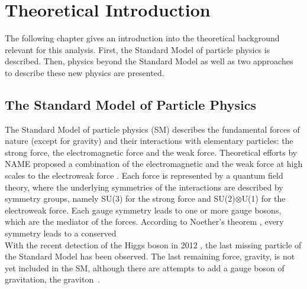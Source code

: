 \chapter{Theoretical Introduction}
\label{chap::TheoreticalIntroduction}
The following chapter gives an introduction into the theoretical background relevant for this analysis. First, the Standard Model of particle physics is described. Then, physics beyond the Standard Model as well as two approaches to describe these new physics are presented.

\section{The Standard Model of Particle Physics}
The Standard Model of particle physics (SM) describes the fundamental forces of nature (except for gravity) and their interactions with elementary particles: the strong force, the electromagnetic force and the weak force. Theoretical efforts by NAME proposed a combination of the electromagnetic and the weak force at high scales to the electroweak force \cite{EWK}. Each force is represented by a quantum field theory, where the underlying symmetries of the interactions are described by symmetry groups, namely SU(3) for the strong force and SU(2)$\otimes$U(1) for the electroweak force. Each gauge symmetry leads to one or more gauge bosons, which are the mediator of the forces. According to Noether's theorem \cite{noether}, every symmetry leads to a conserved \\
With the recent detection of the Higgs boson in 2012 \cite{cms_higgsdiscov}\cite{atlas_higgsdiscov}, the last missing particle of the Standard Model has been observed.
The last remaining force, gravity, is not yet included in the SM, although there are attempts to add a gauge boson of gravitation, the graviton~\cite{}.
